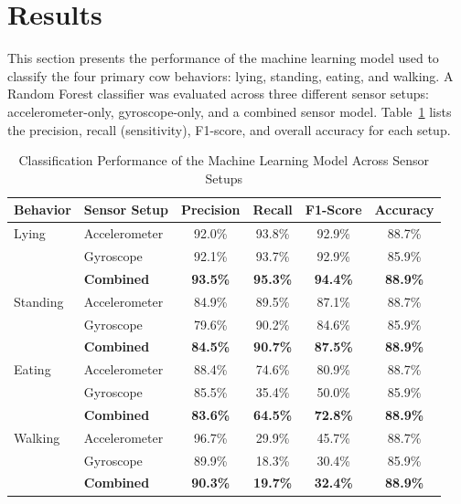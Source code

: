 \documentclass[conference]{IEEEtran}
\begin{document}
\section{Results}

This section presents the performance of the machine learning model used to classify the four primary cow behaviors: lying, standing, eating, and walking. A Random Forest classifier was evaluated across three different sensor setups: accelerometer-only, gyroscope-only, and a combined sensor model. Table~\ref{tab:ml_results} lists the precision, recall (sensitivity), F1-score, and overall accuracy for each setup.

\begin{table}[htbp]
\caption{Classification Performance of the Machine Learning Model Across Sensor Setups}
\label{tab:ml_results}
\centering
\begin{tabular}{llcccc}
\hline
\textbf{Behavior} & \textbf{Sensor Setup} & \textbf{Precision} & \textbf{Recall} & \textbf{F1-Score} & \textbf{Accuracy} \\
\hline
Lying    & Accelerometer     & 92.0\% & 93.8\% & 92.9\% & 88.7\% \\
         & Gyroscope         & 92.1\% & 93.7\% & 92.9\% & 85.9\% \\
         & \textbf{Combined} & \textbf{93.5\%} & \textbf{95.3\%} & \textbf{94.4\%} & \textbf{88.9\%} \\
\hline
Standing & Accelerometer     & 84.9\% & 89.5\% & 87.1\% & 88.7\% \\
         & Gyroscope         & 79.6\% & 90.2\% & 84.6\% & 85.9\% \\
         & \textbf{Combined} & \textbf{84.5\%} & \textbf{90.7\%} & \textbf{87.5\%} & \textbf{88.9\%} \\
\hline
Eating   & Accelerometer     & 88.4\% & 74.6\% & 80.9\% & 88.7\% \\
         & Gyroscope         & 85.5\% & 35.4\% & 50.0\% & 85.9\% \\
         & \textbf{Combined} & \textbf{83.6\%} & \textbf{64.5\%} & \textbf{72.8\%} & \textbf{88.9\%} \\
\hline
Walking  & Accelerometer     & 96.7\% & 29.9\% & 45.7\% & 88.7\% \\
         & Gyroscope         & 89.9\% & 18.3\% & 30.4\% & 85.9\% \\
         & \textbf{Combined} & \textbf{90.3\%} & \textbf{19.7\%} & \textbf{32.4\%} & \textbf{88.9\%} \\
\hline
\end{tabular}
\end{table}
\end{document}
